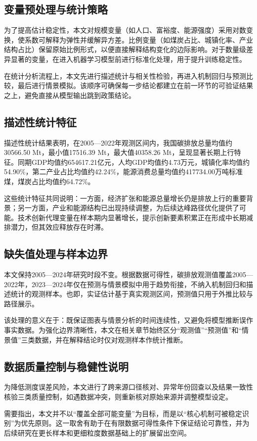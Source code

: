 \subsection{变量预处理与统计策略}
为了提高估计稳定性，本文对规模变量（如人口、富裕度、能源强度）采用对数变换，使系数可解释为弹性并缓解异方差。比例变量（如煤炭占比、城镇化率、产业结构占比）保留原始比例形式，以便直接解释结构变化的边际影响。对于数量级差异显著的变量，在进入机器学习模型前进行标准化处理，用于提升训练稳定性。

在统计分析流程上，本文先进行描述统计与相关性检验，再进入机制回归与预测比较，最后进行情景模拟。该顺序可确保每一步结论都建立在前一环节的可验证结果之上，避免直接从模型输出跳到政策结论。

\subsection{描述性统计特征}
描述性统计结果表明，在2005—2022年观测区间内，我国碳排放总量均值约30566.50 Mt，最小值17516.39 Mt，最大值40358.26 Mt，呈现显著长期上行特征。同期GDP均值约654617.21亿元，人均GDP均值约4.73万元，城镇化率均值约54.90\%，第二产业占比均值约42.24\%，能源消费总量均值约417734.00万吨标准煤，煤炭占比均值约64.72\%。

这些统计特征共同说明：一方面，经济扩张和能源总量增长仍是排放上行的重要背景；另一方面，产业和能源结构已出现持续调整，为后续达峰路径优化提供了可能。技术创新代理变量在样本期内显著增长，提示创新要素积累正在形成中长期减排潜力，但其效应释放存在时滞。

\subsection{缺失值处理与样本边界}
本文保持2005—2024年研究时段不变。根据数据可得性，碳排放观测值覆盖2005—2022年，2023—2024年仅在预测与情景模拟中用于趋势衔接，不纳入机制回归和描述统计的观测样本。也即，实证估计基于真实观测区间，预测值只用于外推比较与路径展示。

该处理的意义在于：既保证图表与情景分析的时间连续性，又避免将模型推断误作事实数据。为强化边界清晰性，本文在相关章节始终区分“观测值”“预测值”和“情景值”三类数据，并在解释结论时仅对观测样本作统计推断。

\subsection{数据质量控制与稳健性说明}
为降低测度误差风险，本文进行了跨来源口径核对、异常年份回查以及结果一致性核验三类质量控制，如遇数据冲突，则重新核对原始来源并调整模型设定。

需要指出，本文并不以“覆盖全部可能变量”为目标，而是以“核心机制可被稳定识别”为优先原则。这一取舍有助于在有限数据可得性条件下保证结论可靠性，并为后续研究在更长样本和更细粒度数据基础上的扩展留出空间。
